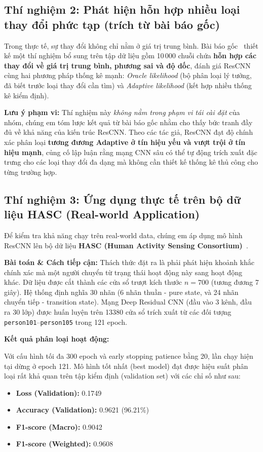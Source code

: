 \subsection{Thí nghiệm 2: Phát hiện hỗn hợp nhiều loại thay đổi phức tạp (trích từ bài báo gốc)}

Trong thực tế, sự thay đổi không chỉ nằm ở giá trị trung bình. Bài báo gốc~\cite{li2024automatic} thiết kế một thí nghiệm bổ sung
 trên tập dữ liệu gồm 10\,000 chuỗi chứa \textbf{hỗn hợp các thay đổi về giá trị trung bình, phương sai và độ dốc}, 
 đánh giá ResCNN cùng hai phương pháp thống kê mạnh: \textit{Oracle likelihood} 
 (bộ phân loại lý tưởng, đã biết trước loại thay đổi cần tìm) và \textit{Adaptive likelihood} (kết hợp nhiều thống kê kiểm định).

\textbf{Lưu ý phạm vi:} Thí nghiệm này \emph{không nằm trong phạm vi tái cài đặt} của nhóm, chúng em tóm lược kết quả từ bài báo gốc nhằm
 cho thấy bức tranh đầy đủ về khả năng của kiến trúc ResCNN. 
 Theo các tác giả, ResCNN đạt độ chính xác phân loại \textbf{tương đương Adaptive ở tín hiệu yếu và vượt trội ở tín hiệu mạnh}, 
 củng cố lập luận rằng mạng CNN sâu có thể tự động trích xuất đặc trưng cho các loại thay đổi đa dạng mà không cần thiết kế thống kê 
 thủ công cho từng trường hợp.

\subsection{Thí nghiệm 3: Ứng dụng thực tế trên bộ dữ liệu HASC (Real-world Application)}

Để kiểm tra khả năng chạy trên real-world data, chúng em áp dụng mô hình ResCNN lên bộ dữ liệu
 \textbf{HASC (Human Activity Sensing Consortium)}~\cite{hasc2011}. 

\textbf{Bài toán \& Cách tiếp cận:} Thách thức đặt ra là phải phát hiện khoảnh khắc chính xác mà một người chuyển từ trạng thái hoạt động
 này sang hoạt động khác. Dữ liệu được cắt thành các cửa sổ trượt kích thước $n=700$ (tương đương 7 giây). 
 Hệ thống định nghĩa 30 nhãn (6 nhãn thuần - pure state, và 24 nhãn chuyển tiếp - transition state). 
 Mạng Deep Residual CNN (đầu vào 3 kênh, đầu ra 30 lớp) được huấn luyện trên 13380 cửa sổ trích xuất từ các đối tượng
  \texttt{person101}--\texttt{person105} trong 121 epoch.

\textbf{Kết quả phân loại hoạt động:}

Với cấu hình tối đa 300 epoch và early stopping patience bằng 20, lần chạy hiện tại dừng ở epoch 121.
Mô hình tốt nhất (best model) đạt được hiệu suất phân loại rất khả quan trên tập kiểm định (validation set) với các chỉ số như sau:
\begin{itemize}
    \item \textbf{Loss (Validation):} 0.1749
    \item \textbf{Accuracy (Validation):} 0.9621 (96.21\%)
    \item \textbf{F1-score (Macro):} 0.9042
    \item \textbf{F1-score (Weighted):} 0.9608
\end{itemize}

